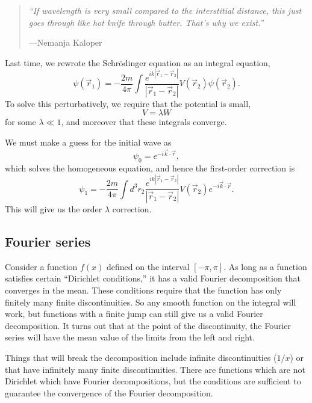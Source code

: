 \begin{quote}
    \textit{``If wavelength is very small compared to the interstitial distance, this just goes through like hot knife through butter. That's why we exist.''
    }
    
    ---Nemanja Kaloper
\end{quote}
Last time, we rewrote the Schr\"odinger equation as an integral equation,
\begin{equation}
    \psi(\vec r_1) = -\frac{2m}{4\pi} \int \frac{e^{ik |\vec r_1 -\vec r_2|}}{|\vec r_1 - \vec r_2|} V(\vec r_2) \psi(\vec r_2).
\end{equation}
To solve this perturbatively, we require that the potential is small,
\begin{equation}
    V= \lambda W
\end{equation}
for some $\lambda \ll 1$, and moreover that these integrals converge.

We must make a guess for the initial wave as
\begin{equation}
    \psi_0 = e^{-i \vec k \cdot \vec r},
\end{equation}
which solves the homogeneous equation, and hence the first-order correction is
\begin{equation}
    \psi_1 = -\frac{2m}{4\pi} \int d^3r_2 \frac{e^{ik |\vec r_1 -\vec r_2|}}{|\vec r_1 - \vec r_2|} V(\vec r_2) e^{-i \vec k \cdot \vec r}.
\end{equation}
This will give us the order $\lambda$ correction.

\subsection*{Fourier series}
Consider a function $f(x)$ defined on the interval $[-\pi,\pi]$. As long as a function satisfies certain ``Dirichlet conditions,'' it has a valid Fourier decomposition that converges in the mean. These conditions require that the function has only finitely many finite discontinuities. So any smooth function on the integral will work, but functions with a finite jump can still give us a valid Fourier decomposition. It turns out that at the point of the discontinuity, the Fourier series will have the mean value of the limits from the left and right.

Things that will break the decomposition include infinite discontinuities ($1/x$) or that have infinitely many finite discontinuities. There are functions which are not Dirichlet which have Fourier decompositions, but the conditions are sufficient to guarantee the convergence of the Fourier decomposition.

